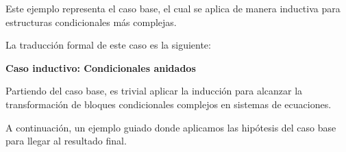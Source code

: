 \documentclass[a4paper,12pt]{report}
\begin{document}
	
	\vspace{0.2cm}
	\noindent Este ejemplo representa el caso base, el cual se aplica de manera inductiva para estructuras condicionales más complejas.
	
	\vspace{0.2cm}
	\noindent La traducción formal de este caso es la siguiente:
	
	\vspace{0.5cm}
	\noindent \textbf{Caso inductivo: Condicionales anidados}
	\vspace{0.3cm}
	
	\noindent Partiendo del caso base, es trivial aplicar la inducción para alcanzar la transformación de bloques condicionales complejos en sistemas de ecuaciones.
	
	\vspace{0.22cm}
	\noindent A continuación, un ejemplo guiado donde aplicamos las hipótesis del caso base para llegar al resultado final.
	
\end{document}
